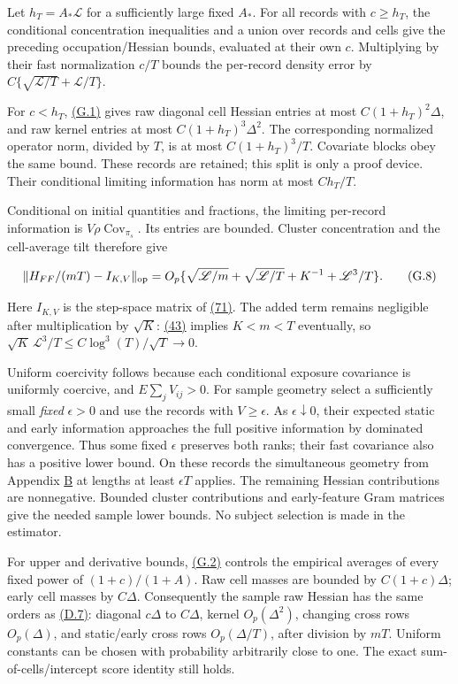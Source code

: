 \documentclass[11pt]{article}
\begin{document}
Let \(h_T=A_*\mathscr L\) for a sufficiently large fixed \(A_*\). For all records with \(c\geq h_T\), the conditional concentration inequalities and a union over records and cells give the preceding occupation/Hessian bounds, evaluated at their own \(c\). Multiplying by their fast normalization \(c/T\) bounds the per-record density error by
\(C\{\sqrt{\mathscr L/T}+\mathscr L/T\}\).

For \(c<h_T\), \hyperref[eq:G.1]{(G.1)} gives raw diagonal cell Hessian entries at most \(C(1+h_T)^2\Delta\), and raw kernel entries at most \(C(1+h_T)^3\Delta^2\). The corresponding normalized operator norm, divided by \(T\), is at most \(C(1+h_T)^3/T\). Covariate blocks obey the same bound. These records are retained; this split is only a proof device. Their conditional limiting information has norm at most \(Ch_T/T\).

Conditional on initial quantities and fractions, the limiting per-record information is \(V\rho\operatorname{Cov}_{\pi_s}\). Its entries are bounded. Cluster concentration and the cell-average tilt therefore give

\begin{equation*}
\|H_{FF}/(mT)-I_{K,V}\|_{\rm op}
=O_p\{\sqrt{\mathscr L/m}+\sqrt{\mathscr L/T}
       +K^{-1}+\mathscr L^3/T\}.
\tag{G.8}\label{eq:G.8}
\end{equation*}

Here \(I_{K,V}\) is the step-space matrix of \hyperref[eq:71]{(71)}. The added term remains negligible after multiplication by \(\sqrt K\): \hyperref[eq:43]{(43)} implies \(K<m<T\) eventually, so
\(\sqrt K\,\mathscr L^3/T\leq C\log^3(T)/\sqrt T\to0\).

Uniform coercivity follows because each conditional exposure covariance is uniformly coercive, and \(E\sum_jV_{ij}>0\). For sample geometry select a sufficiently small \emph{fixed} \(\epsilon>0\) and use the records with \(V\geq\epsilon\). As \(\epsilon\downarrow0\), their expected static and early information approaches the full positive information by dominated convergence. Thus some fixed \(\epsilon\) preserves both ranks; their fast covariance also has a positive lower bound. On these records the simultaneous geometry from Appendix \hyperref[sec:B]{B} at lengths at least \(\epsilon T\) applies. The remaining Hessian contributions are nonnegative. Bounded cluster contributions and early-feature Gram matrices give the needed sample lower bounds. No subject selection is made in the estimator.

For upper and derivative bounds, \hyperref[eq:G.2]{(G.2)} controls the empirical averages of every fixed power of \((1+c)/(1+A)\). Raw cell masses are bounded by \(C(1+c)\Delta\); early cell masses by \(C\Delta\). Consequently the sample raw Hessian has the same orders as \hyperref[eq:D.7]{(D.7)}: diagonal \(c\Delta\) to \(C\Delta\), kernel \(O_p(\Delta^2)\), changing cross rows \(O_p(\Delta)\), and static/early cross rows \(O_p(\Delta/T)\), after division by \(mT\). Uniform constants can be chosen with probability arbitrarily close to one. The exact sum-of-cells/intercept score identity still holds.
\end{document}
